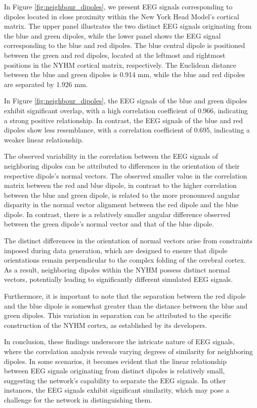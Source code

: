 \documentclass[a4paper, UKenglish, 11pt]{uiomaster}
\begin{document}
In Figure \ref{fig:neighbour_dipoles}, we present EEG signals corresponding to dipoles located in close proximity within the New York Head Model's cortical matrix. The upper panel illustrates the two distinct EEG signals originating from the blue and green dipoles, while the lower panel shows the EEG signal corresponding to the blue and red dipoles. The blue central dipole is positioned between the green and red dipoles, located at the leftmost and rightmost positions in the NYHM cortical matrix, respectively. The Euclidean distance between the blue and green dipoles is 0.914 mm, while the blue and red dipoles are separated by 1.926 mm.

In Figure \ref{fig:neighbour_dipoles}, the EEG signals of the blue and green dipoles exhibit significant overlap, with a high correlation coefficient of 0.966, indicating a strong positive relationship. In contrast, the EEG signals of the blue and red dipoles show less resemblance, with a correlation coefficient of 0.695, indicating a weaker linear relationship.

The observed variability in the correlation between the EEG signals of neighboring dipoles can be attributed to differences in the orientation of their respective dipole's normal vectors. The observed smaller value in the correlation matrix between the red and blue dipole, in contrast to the higher correlation between the blue and green dipole, is related to the more pronounced angular disparity in the normal vector alignment between the red dipole and the blue dipole. In contrast, there is a relatively smaller angular difference observed between the green dipole's normal vector and that of the blue dipole.

The distinct differences in the orientation of normal vectors arise from constraints imposed during data generation, which are designed to ensure that dipole orientations remain perpendicular to the complex folding of the cerebral cortex. As a result, neighboring dipoles within the NYHM possess distinct normal vectors, potentially leading to significantly different simulated EEG signals.

Furthermore, it is important to note that the separation between the red dipole and the blue dipole is somewhat greater than the distance between the blue and green dipoles. This variation in separation can be attributed to the specific construction of the NYHM cortex, as established by its developers.

In conclusion, these findings underscore the intricate nature of EEG signals, where the correlation analysis reveals varying degrees of similarity for neighboring dipoles. In some scenarios, it becomes evident that the linear relationship between EEG signals originating from distinct dipoles is relatively small, suggesting the network's capability to separate the EEG signals. In other instances, the EEG signals exhibit significant similarity, which may pose a challenge for the network in distinguishing them.
\end{document}
